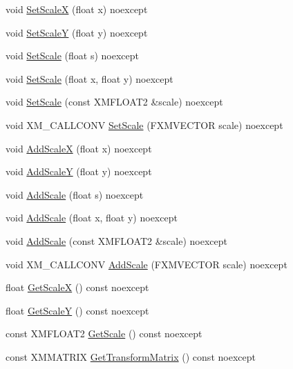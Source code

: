\begin{DoxyCompactItemize}
\item 
void \hyperlink{structmage_1_1_sprite_transform_af03d3643320de29f26051f29539ad38b}{Set\+ScaleX} (float x) noexcept
\item 
void \hyperlink{structmage_1_1_sprite_transform_aa66b3ada5d91c20a12f7dff0948bdabb}{Set\+ScaleY} (float y) noexcept
\item 
void \hyperlink{structmage_1_1_sprite_transform_adb044fea32dd1a279a51728d38f50300}{Set\+Scale} (float s) noexcept
\item 
void \hyperlink{structmage_1_1_sprite_transform_a43e07fe0f5bb995625e2733cb7b4673f}{Set\+Scale} (float x, float y) noexcept
\item 
void \hyperlink{structmage_1_1_sprite_transform_aa79eda5450bbb7e46f5d51cb3be18276}{Set\+Scale} (const X\+M\+F\+L\+O\+A\+T2 \&scale) noexcept
\item 
void X\+M\+\_\+\+C\+A\+L\+L\+C\+O\+NV \hyperlink{structmage_1_1_sprite_transform_a1e9c60025ebbbaf88fe17af85526f5c8}{Set\+Scale} (F\+X\+M\+V\+E\+C\+T\+OR scale) noexcept
\item 
void \hyperlink{structmage_1_1_sprite_transform_a55739f412a5e6e94fb841f552a2b5356}{Add\+ScaleX} (float x) noexcept
\item 
void \hyperlink{structmage_1_1_sprite_transform_a2cc81e5af3ec1e1d78a5ba0e1abf1d4f}{Add\+ScaleY} (float y) noexcept
\item 
void \hyperlink{structmage_1_1_sprite_transform_ad1246a7488bf8cea0df893f9c78022ab}{Add\+Scale} (float s) noexcept
\item 
void \hyperlink{structmage_1_1_sprite_transform_a8cefcfcef4032250c006c07fa2110d48}{Add\+Scale} (float x, float y) noexcept
\item 
void \hyperlink{structmage_1_1_sprite_transform_aed6471e3e51cafe1a2f4651b0f1f4456}{Add\+Scale} (const X\+M\+F\+L\+O\+A\+T2 \&scale) noexcept
\item 
void X\+M\+\_\+\+C\+A\+L\+L\+C\+O\+NV \hyperlink{structmage_1_1_sprite_transform_a9064eb670f25dbcd6937971b9ccaadda}{Add\+Scale} (F\+X\+M\+V\+E\+C\+T\+OR scale) noexcept
\item 
float \hyperlink{structmage_1_1_sprite_transform_a5ba0dc3dabd968dfd91eb11cca0b43fa}{Get\+ScaleX} () const noexcept
\item 
float \hyperlink{structmage_1_1_sprite_transform_acab545ce4e0f658dc9207fb2d91aa2ab}{Get\+ScaleY} () const noexcept
\item 
const X\+M\+F\+L\+O\+A\+T2 \hyperlink{structmage_1_1_sprite_transform_ac62a9a5b40abbbb40398885010990e55}{Get\+Scale} () const noexcept
\item 
const X\+M\+M\+A\+T\+R\+IX \hyperlink{structmage_1_1_sprite_transform_a4e5d58a02d951c021e3e41e4ac183d0d}{Get\+Transform\+Matrix} () const noexcept
\end{DoxyCompactItemize}
